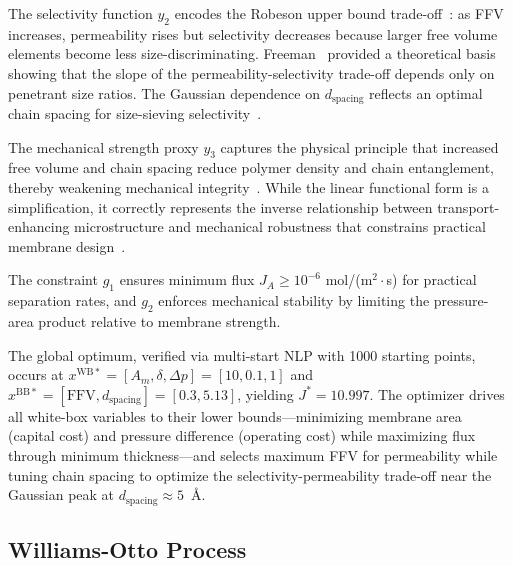 \documentclass[12pt,a4paper]{article}%
\theoremstyle{plain}%
\theoremstyle{remark}%
\theoremstyle{definition}%
\def\WB{\mathrm{WB}}
\def\BB{\mathrm{BB}}
\begin{document}
\begin{appendices}
The selectivity function $y_2$ encodes the Robeson upper bound trade-off~\cite{robeson1991correlation,robeson2008upper}: as FFV increases, permeability rises but selectivity decreases because larger free volume elements become less size-discriminating. Freeman~\cite{freeman1999basis} provided a theoretical basis showing that the slope of the permeability-selectivity trade-off depends only on penetrant size ratios. The Gaussian dependence on $d_{\text{spacing}}$ reflects an optimal chain spacing for size-sieving selectivity~\cite{park2017maximizing}.

The mechanical strength proxy $y_3$ captures the physical principle that increased free volume and chain spacing reduce polymer density and chain entanglement, thereby weakening mechanical integrity~\cite{bondi1964van}. While the linear functional form is a simplification, it correctly represents the inverse relationship between transport-enhancing microstructure and mechanical robustness that constrains practical membrane design~\cite{chiwaye2025superstructure}.

The constraint $g_1$ ensures minimum flux $J_A \geq 10^{-6}$ mol/(m$^2\cdot$s) for practical separation rates, and $g_2$ enforces mechanical stability by limiting the pressure-area product relative to membrane strength.

The global optimum, verified via multi-start NLP with 1000 starting points, occurs at $x^{\WB*} = [A_m, \delta, \Delta p] = [10, 0.1, 1]$ and $x^{\BB*} = [\text{FFV}, d_{\text{spacing}}] = [0.3, 5.13]$, yielding $J^* = 10.997$. The optimizer drives all white-box variables to their lower bounds---minimizing membrane area (capital cost) and pressure difference (operating cost) while maximizing flux through minimum thickness---and selects maximum FFV for permeability while tuning chain spacing to optimize the selectivity-permeability trade-off near the Gaussian peak at $d_{\text{spacing}} \approx 5$~\AA.

\subsection{Williams-Otto Process}\label{subsec:app_williams_otto}


\end{appendices}
\end{document}
